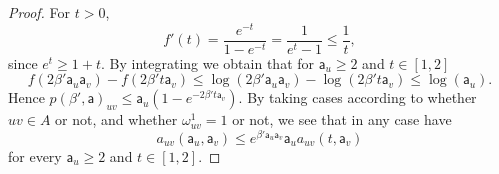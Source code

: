 \documentclass[11pt,a4paper]{article}
\theoremstyle{definition}
\numberwithin{equation}{section}
\begin{document}
\begin{proof}
For $t>0$,
\begin{equation}
f'(t)=\frac{e^{-t}}{1-e^{-t}}=\frac{1}{e^t-1}\leq \frac{1}{t},
\end{equation}
since $e^t\geq 1+t$. By integrating we obtain that for $\mathsf{a}_u\geq 2$ and $t\in [1,2]$
\begin{equation}
f(2\beta' \mathsf{a}_u \mathsf{a}_v)-f(2\beta' t \mathsf{a}_v)\leq \log(2\beta' \mathsf{a}_u \mathsf{a}_v)-\log(2\beta' t \mathsf{a}_v)\leq \log(\mathsf{a}_u).
\end{equation}
Hence $p(\beta',\mathsf a)_{uv} \leq \mathsf a_u(1- e^{-2\beta' t \mathsf a_v})$.
By taking cases according to whether $uv \in A$ or not, and whether $\omega^1_{uv}=1$ or not, we see that in any case have
\begin{equation}\label{eq: a estimate}
a_{uv}(\mathsf{a}_u,\mathsf{a}_v)\leq e^{\beta'\mathsf{a}_u \mathsf{a}_v} \mathsf{a}_u a_{uv}(t,\mathsf{a}_v)   
\end{equation} 
for every $\mathsf{a}_u\geq 2$ and $t\in [1,2]$.



\end{proof}
\end{document}
